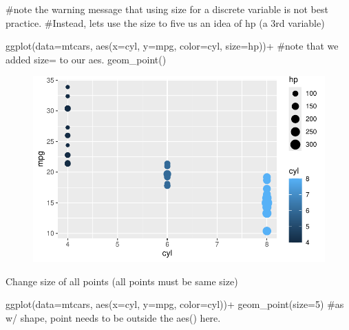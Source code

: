 \documentclass[
  letterpaper,
  DIV=11,
  numbers=noendperiod]{scrartcl}
\newenvironment{Shaded}{\begin{snugshade}}{\end{snugshade}}
\newcommand{\AttributeTok}[1]{\textcolor[rgb]{0.40,0.45,0.13}{#1}}
\newcommand{\CommentTok}[1]{\textcolor[rgb]{0.37,0.37,0.37}{#1}}
\newcommand{\DecValTok}[1]{\textcolor[rgb]{0.68,0.00,0.00}{#1}}
\newcommand{\FunctionTok}[1]{\textcolor[rgb]{0.28,0.35,0.67}{#1}}
\newcommand{\NormalTok}[1]{\textcolor[rgb]{0.00,0.23,0.31}{#1}}
\newcommand{\SpecialCharTok}[1]{\textcolor[rgb]{0.37,0.37,0.37}{#1}}
\begin{document}
\begin{Shaded}
\begin{Highlighting}[]
\CommentTok{\#note the warning message that using size for a discrete variable is not best practice. }
\CommentTok{\#Instead, let\textquotesingle{}s use the size to five us an idea of hp (a 3rd variable)}

\FunctionTok{ggplot}\NormalTok{(}\AttributeTok{data=}\NormalTok{mtcars, }\FunctionTok{aes}\NormalTok{(}\AttributeTok{x=}\NormalTok{cyl, }\AttributeTok{y=}\NormalTok{mpg, }\AttributeTok{color=}\NormalTok{cyl, }\AttributeTok{size=}\NormalTok{hp))}\SpecialCharTok{+} \CommentTok{\#note that we added \textquotesingle{}size=\textquotesingle{} to our aes. }
  \FunctionTok{geom\_point}\NormalTok{()}
\end{Highlighting}
\end{Shaded}

\begin{figure}[H]

{\centering \includegraphics{Lab_2_files/figure-pdf/unnamed-chunk-31-2.pdf}

}

\end{figure}

Change size of all points (all points must be same size)

\begin{Shaded}
\begin{Highlighting}[]
\FunctionTok{ggplot}\NormalTok{(}\AttributeTok{data=}\NormalTok{mtcars, }\FunctionTok{aes}\NormalTok{(}\AttributeTok{x=}\NormalTok{cyl, }\AttributeTok{y=}\NormalTok{mpg, }\AttributeTok{color=}\NormalTok{cyl))}\SpecialCharTok{+}  
  \FunctionTok{geom\_point}\NormalTok{(}\AttributeTok{size=}\DecValTok{5}\NormalTok{) }\CommentTok{\#as w/ shape, point needs to be outside the aes() here. }
\end{Highlighting}
\end{Shaded}
\end{document}
